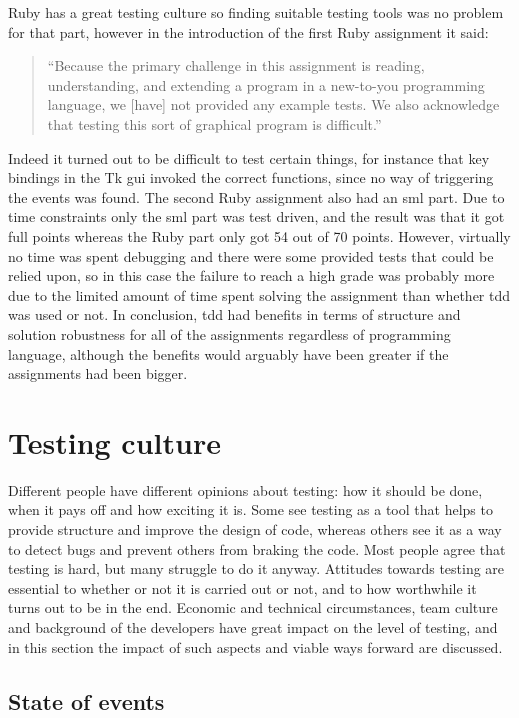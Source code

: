 \documentclass[11pt]{article}
\begin{document}
Ruby has a great testing culture so finding suitable testing tools was no problem for that part, however in the introduction of the first Ruby assignment it said:

\begin{quote}
``Because the primary challenge in this assignment is reading, understanding, and extending a program in a new-to-you programming language, we [have] not provided any example tests. We also acknowledge that testing this sort of graphical program is difficult.''
\end{quote}

Indeed it turned out to be difficult to test certain things, for instance that key bindings in the Tk \gls{gui} invoked the correct functions, since no way of triggering the events was found. The second Ruby assignment also had an \gls{sml} part. Due to time constraints only the \gls{sml} part was test driven, and the result was that it got full points whereas the Ruby part only got 54 out of 70 points. However, virtually no time was spent debugging and there were some provided tests that could be relied upon, so in this case the failure to reach a high grade was probably more due to the limited amount of time spent solving the assignment than whether \gls{tdd} was used or not.
In conclusion, \gls{tdd} had benefits in terms of structure and solution robustness for all of the assignments regardless of programming language, although the benefits would arguably have been greater if the assignments had been bigger.


\section{Testing culture}
\label{sec:testingculture}

Different people have different opinions about testing: how it should be done, when it pays off and how exciting it is. Some see testing as a tool that helps to provide structure and improve the design of code, whereas others see it as a way to detect bugs and prevent others from braking the code. Most people agree that testing is hard, but many struggle to do it anyway. Attitudes towards testing are essential to whether or not it is carried out or not, and to how worthwhile it turns out to be in the end. Economic and technical circumstances, team culture and background of the developers have great impact on the level of testing, and in this section the impact of such aspects and viable ways forward are discussed.

\subsection{State of events}
\label{subsec:stateofevents}
\end{document}
